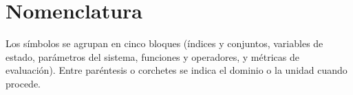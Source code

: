 \section*{Nomenclatura}
\label{sec:nomenclatura}

Los símbolos se agrupan en cinco bloques (índices y conjuntos, variables de estado,
parámetros del sistema, funciones y operadores, y métricas de evaluación). Entre
paréntesis o corchetes se indica el dominio o la unidad cuando procede.

\begingroup
\linespread{1.2}\selectfont
\setlength{\tabcolsep}{3pt}
\renewcommand{\arraystretch}{1.15}
\setlength{\LTpre}{6pt}
\setlength{\LTpost}{6pt}

\newcommand{\nomhead}[1]{\addlinespace[2pt]%
  \multicolumn{2}{@{}l}{\bfseries\color{VIUOrange}#1}\\*[1pt]}


